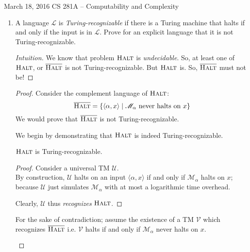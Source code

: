 \documentclass[usletter]{article}
\newcommand {\langset}[1]      {\ensuremath{\mathcal{#1}}}
\newcommand {\machine}[1]      {\ensuremath{\mathscr{#1}}}
\newcommand {\namedlangset}[1] {\ensuremath{\textnormal{\textsc{#1}}}}
\newcommand {\term}[1]      {\textit{#1}}
\newcommand {\langL}          {\langset{L}}
\newcommand {\machineM}       {\machine{M}}
\begin{document}
 {March 18, 2016}
            {CS 281A -- Computability and Complexity}

\begin{enumerate}[labelsep=2.5em, label=\textbf{\arabic{enumi}}]
  \item A language $\langL$ is \term{Turing-recognizable} if there is a Turing
        machine that halts if and only if the input is in \langL. Prove for an
        explicit language that it is not Turing-recognizable.
  \begin{proof}[Intuition]
    We know that problem \namedlangset{Halt} is \term{undecidable}. So, at least
    one of \namedlangset{Halt}, or $\overline{\namedlangset{Halt}}$ is not
    Turing-recognizable.
    But \namedlangset{Halt} is. So, $\overline{\namedlangset{Halt}}$ must not be!
  \end{proof}
  \begin{proof}
    Consider the complement language of \namedlangset{Halt}:
    $$ \overline{\namedlangset{Halt}}
    = \{ \langle \alpha, x \rangle \mid
         \machineM_\alpha \text{ never halts on } x \} $$
    We would prove that $\overline{\namedlangset{Halt}}$ is not
    Turing-recognizable.

    We begin by demonstrating that \namedlangset{Halt} is indeed
    Turing-recognizable.
    \begin{claim}\namedlangset{Halt} is Turing-recognizable.\end{claim}
    \begin{proof}
      Consider a universal TM \machine{U}. \\
      By construction, \machine{U} halts on an input $\langle \alpha, x \rangle$
      if and only if $\machineM_\alpha$ halts on $x$; because \machine{U} just
      simulates $\machineM_\alpha$ with at most a logarithmic time overhead.

      Clearly, \machine{U} thus \term{recognizes} \namedlangset{Halt}.
    \end{proof}

    \begin{assumption}
      For the sake of contradiction; assume the existence of a TM \machine{V}
      which recognizes $\overline{\namedlangset{Halt}}$ i.e. \machine{V} halts if
      and only if $\machineM_\alpha$ never halts on $x$.
    \end{assumption}


\end{proof}
\end{enumerate}
\end{document}
